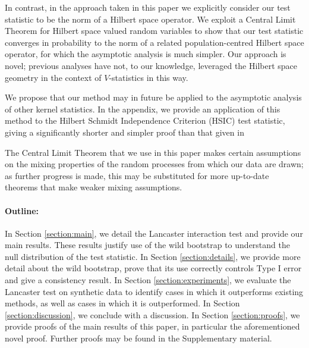 \documentclass[]{article}
\begin{document}
In contrast, in the approach taken in this paper we explicitly consider our test statistic to be the norm of a Hilbert space operator. We exploit a Central Limit Theorem for Hilbert space valued random variables to show that our test statistic converges in probability to the norm of a related population-centred Hilbert space operator, for which the asymptotic analysis is much simpler. Our approach is novel; previous analyses have not, to our knowledge, leveraged the Hilbert space geometry in the context of $V$-statistics in this way. 

We propose that our method may in future be applied to the asymptotic analysis of other kernel statistics. In the appendix, we provide an application of this method to the Hilbert Schmidt Independence Criterion (HSIC) test statistic, giving a significantly shorter and simpler proof than that given in \citet{chwialkowski2014kernel}

The Central Limit Theorem that we use in this paper makes certain assumptions on the mixing properties of the random processes from which our data are drawn; as further progress is made, this may be substituted for more up-to-date theorems that make weaker mixing assumptions.

\paragraph{Outline:}
In Section \ref{section:main}, we detail the Lancaster interaction test and provide our main results. These results justify use of the wild bootstrap to understand the null distribution of the test statistic. In Section \ref{section:details}, we provide more detail about the wild bootstrap, prove that its use correctly controls Type I error and give a consistency result. In Section \ref{section:experiments}, we evaluate the Lancaster test on synthetic data to identify cases in which it outperforms existing methods, as well as cases in which it is outperformed. In Section \ref{section:discussion}, we conclude with a discussion. In Section \ref{section:proofs}, we provide proofs of the main results of this paper, in particular the aforementioned novel proof. Further proofs may be found in the Supplementary material.

\end{document}
